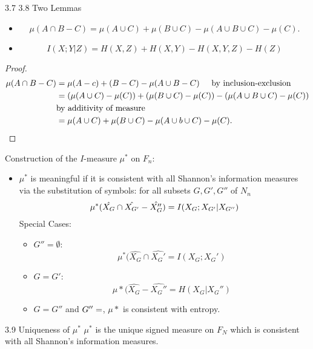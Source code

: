 \documentclass[../main.tex]{subfiles}
\begin{document}
\begin{bbox}{3.7 3.8 Two Lemmas}
    \begin{itemize}
        \item \begin{equation*}
            \mu(A\cap B-C)= \mu(A\cup C)+\mu(B\cup C)-\mu(A\cup B\cup C)-\mu(C).
        \end{equation*}
        \item \begin{equation*}
            I(X;Y|Z)=H(X,Z) + H(X, Y) - H(X,Y,Z)-H(Z)
        \end{equation*}
    \end{itemize}
    \begin{proof}
        \begin{align*}
            \mu(A\cap B-C) &= \mu(A-c)+(B-C)-\mu(A\cup B -C) \hspace{5mm}\text{by inclusion-exclusion}\\
            &=(\mu(A\cup C)-\mu(C))+(\mu(B\cup C)-\mu(C))-(\mu(A\cup B\cup C)-\mu(C))\\
            &\text{by additivity of measure}\\            &=\mu(A\cup C)+\mu(B\cup C)-\mu(A\cup b\cup C)-\mu(C).
        \end{align*}
    \end{proof}
\end{bbox}
Construction of the $I$-measure $\mu^*$ on $F_n$:
\begin{itemize}
    \item $\mu^*$ is meaningful if it is consistent with all Shannon's information measures via the substitution of symbols: for all subsets $G, G', G''$ of $N_n$\begin{equation*}
        \mu^*(\hat{X_G}\cap \hat{X_{G'}}-\hat{X_G''})=I(X_G;X_{G'}|X_{G''})
    \end{equation*}
    Special Cases:\begin{itemize}
        \item $G''=\emptyset$:
        \begin{equation*}
            \mu^*(\hat{X_G}\cap \hat{X_G'}=I(X_G;X_G')
        \end{equation*}
        \item 
        $G=G'$:\begin{equation*}
            \mu*(\hat{X_G}-\hat{X_G''}=H(X_G|X_G'')
        \end{equation*}
        \item $G=G''$ and $G''=\empty$, $\mu*$ is consistent with entropy.
    \end{itemize}
\end{itemize}
\begin{bbox}{3.9 Uniqueness of $\mu^*$}
    $\mu^*$ is the unique signed measure on $F_N$ which is consistent with all Shannon's information measures.
\end{bbox}
\end{document}

